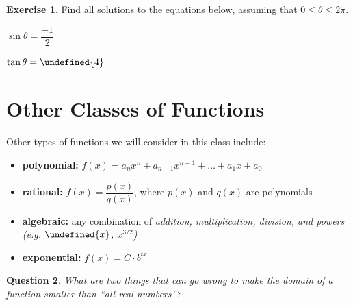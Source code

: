 \documentclass[11pt,reqno,final]{amsart}
\makeatletter
\let\sqrt=\undefined
\DeclareRobustCommand\sqrt{\@ifnextchar[\@sqrt{\mathpalette\@x@sqrt}}
\def\@x@sqrt#1#2{%
 \setbox\z@\hbox{$\m@th#1\sqrtsign{\mkern1mu #2}$}
 \mkern3mu\box\z@}
\numberwithin{equation}{section}
\numberwithin{figure}{section}
\newtheorem{question}{Question}
\theoremstyle{definition} %
\newtheorem{exercise}[question]{Exercise}
\makeatother
\begin{document}
\begin{exercise}
        Find all solutions to the equations below, assuming that $0 \leq \theta \leq 2 \pi$.\\
        \begin{enumerate*}[(a)]
        \item $\sin \theta = \dfrac{-1}{2}$ \qquad \qquad $ $ \qquad \qquad $ $ \qquad \qquad $ $
        \item $\tan \theta = \sqrt{4}$
        \end{enumerate*}
        \vfill
\end{exercise}

\newpage

\section{Other Classes of Functions}



\begin{framed}
        Other types of functions we will consider in this class include:\\
        \begin{itemize}
        \item \textbf{polynomial:} $f(x) = a_n x^n + a_{n-1}x^{n-1} + \dots + a_1 x + a_0$\\ 
        \item \textbf{rational:} $f(x) = \dfrac{p(x)}{q(x)}$, \quad where $p(x)$ and $q(x)$ are polynomials\\
        \item \textbf{algebraic:} any combination of \textit{addition, multiplication, division, and powers (e.g. $\sqrt{x}$, $x^{3/2}$)}\\
        \item \textbf{exponential:} $f(x) = C \cdot b^{tx}$
        \end{itemize}        
\end{framed}

\begin{question}
        What are two things that can go wrong to make the domain of a function smaller than ``all real numbers''?\\[10pt]
\end{question}
\end{document}
